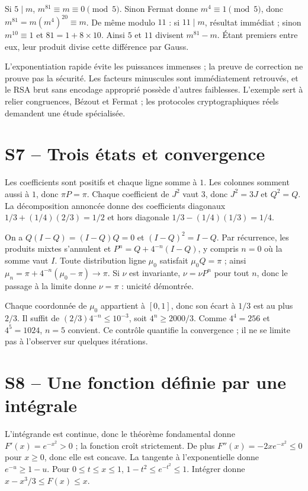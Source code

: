 Si $5\mid m$, $m^{81}\equiv m\equiv0\pmod5$. Sinon Fermat donne $m^4\equiv1\pmod5$, donc $m^{81}=m(m^4)^{20}\equiv m$. De même modulo $11$ : si $11\mid m$, résultat immédiat ; sinon $m^{10}\equiv1$ et $81=1+8\times10$. Ainsi $5$ et $11$ divisent $m^{81}-m$. Étant premiers entre eux, leur produit divise cette différence par Gauss.

L'exponentiation rapide évite les puissances immenses ; la preuve de correction ne prouve pas la sécurité. Les facteurs minuscules sont immédiatement retrouvés, et le RSA brut sans encodage approprié possède d'autres faiblesses. L'exemple sert à relier congruences, Bézout et Fermat ; les protocoles cryptographiques réels demandent une étude spécialisée.

\section{S7 -- Trois états et convergence}
Les coefficients sont positifs et chaque ligne somme à $1$. Les colonnes somment aussi à $1$, donc $\pi P=\pi$. Chaque coefficient de $J^2$ vaut $3$, donc $J^2=3J$ et $Q^2=Q$. La décomposition annoncée donne des coefficients diagonaux $1/3+(1/4)(2/3)=1/2$ et hors diagonale $1/3-(1/4)(1/3)=1/4$.

On a $Q(I-Q)=(I-Q)Q=0$ et $(I-Q)^2=I-Q$. Par récurrence, les produits mixtes s'annulent et $P^n=Q+4^{-n}(I-Q)$, y compris $n=0$ où la somme vaut $I$.
Toute distribution ligne $\mu_0$ satisfait $\mu_0Q=\pi$ ; ainsi
$\mu_n=\pi+4^{-n}(\mu_0-\pi)\to\pi$.
Si $\nu$ est invariante, $\nu=\nu P^n$ pour tout $n$, donc le passage à la limite donne $\nu=\pi$ : unicité démontrée.

Chaque coordonnée de $\mu_0$ appartient à $[0,1]$, donc son écart à $1/3$ est au plus $2/3$. Il suffit de $(2/3)4^{-n}\le10^{-3}$, soit $4^n\ge2000/3$. Comme $4^4=256$ et $4^5=1024$, $n=5$ convient. Ce contrôle quantifie la convergence ; il ne se limite pas à l'observer sur quelques itérations.

\section{S8 -- Une fonction définie par une intégrale}
L'intégrande est continue, donc le théorème fondamental donne $F'(x)=e^{-x^2}>0$ ; la fonction croît strictement. De plus $F''(x)=-2xe^{-x^2}\le0$ pour $x\ge0$, donc elle est concave.
La tangente à l'exponentielle donne $e^{-u}\ge1-u$. Pour $0\le t\le x\le1$, $1-t^2\le e^{-t^2}\le1$. Intégrer donne $x-x^3/3\le F(x)\le x$.

